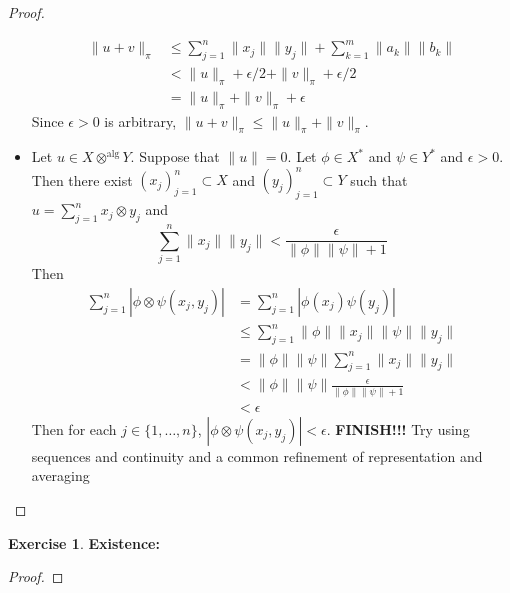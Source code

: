 \documentclass[12pt]{amsart}
\theoremstyle{definition}
\newtheorem{ex}[definition]{Exercise}
\newcommand{\ep}{\epsilon}
\newcommand{\tbf}[1]{\textbf{#1}}
\DeclareMathOperator*{\0}{\mbf{0}}
\DeclareMathOperator*{\1}{\mbf{1}}
\begin{document}
\begin{proof}
\begin{itemize}
	\begin{align*}
	\|u + v\|_{\pi} 
	& \leq \sum\limits_{j=1}^n \|x_j\| \|y_j\| + \sum\limits_{k=1}^m \|a_k\| \|b_k\| \\
	&< \|u\|_{\pi} + \ep/2 + \|v\|_{\pi} + \ep/2 \\
	&= \|u\|_{\pi} + \|v\|_{\pi} + \ep
	\end{align*}
	Since $\ep >0$ is arbitrary, $\|u + v\|_{\pi} \leq \|u\|_{\pi} + \|v\|_{\pi}$.
	\item Let $u \in X \otimes^{\text{alg}} Y$. Suppose that $\|u\| = 0$. Let $\phi \in X^*$ and $\psi \in Y^*$ and $\ep >0$. Then there exist $(x_j)_{j=1}^n \subset X$ and $(y_j)_{j=1}^n \subset Y$ such that $u = \sum\limits_{j=1}^n x_j \otimes y_j $ and $$\sum\limits_{j=1}^n \|x_j\| \|y_j\| < \frac{\ep}{\|\phi\| \|\psi\| + 1}$$
	Then 
	\begin{align*}
	\sum_{j=1}^n |\phi \otimes \psi(x_j,y_j)|
	&=  \sum_{j=1}^n |\phi(x_j)\psi(y_j)| \\
	& \leq  \sum_{j=1}^n \|\phi\|\|x_j\| \|\psi\|\|y_j\| \\
	&= \|\phi\|\|\psi\|\sum_{j=1}^n \|x_j\| \|y_j\| \\
	& < \|\phi\|\|\psi\|\frac{\ep}{\|\phi\| \|\psi\| + 1} \\
	& < \ep
	\end{align*}
	Then for each $j \in \{1, \ldots, n\}$, $|\phi \otimes \psi(x_j,y_j)| < \ep$.
	\tbf{FINISH!!!} Try using sequences and continuity and a common refinement of representation and averaging
	\end{itemize}
	\end{proof}
	
	\begin{ex} \tbf{Existence:} \\
	
	\end{ex}
	
	\begin{proof}
	
	\end{proof}	
	
	
	
	
	
	
	
	
	
	
	
	
	
	
	
	
	
	
	
	
	
	
	
\end{document}

